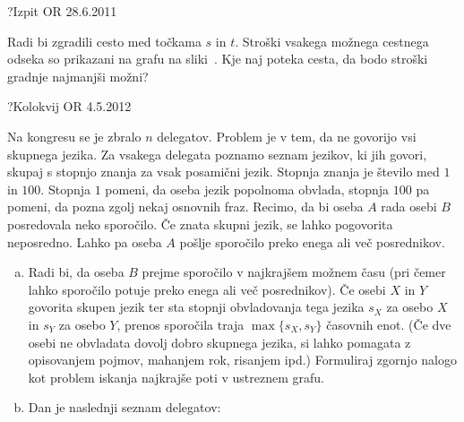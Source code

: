 \begin{naloga}{?}{Izpit OR 28.6.2011}
\begin{vprasanje}[cesta]
Radi bi zgradili cesto med točkama $s$ in $t$.
Stroški vsakega možnega cestnega odseka so prikazani na grafu na sliki~\fig{}.
Kje naj poteka cesta, da bodo stroški gradnje najmanjši možni?

\begin{slika}
\pgfslika
{}
\end{slika}
\end{vprasanje}
\begin{odgovor}
\end{odgovor}
\end{naloga}


\begin{naloga}{?}{Kolokvij OR 4.5.2012}
\begin{vprasanje}
Na kongresu se je zbralo $n$ delegatov.
Problem je v tem, da ne govorijo vsi skup\-ne\-ga jezika.
Za vsakega delegata poznamo seznam jezikov, ki jih govori,
skupaj s stopnjo znanja za vsak posamični jezik.
Stopnja znanja je število med $1$ in $100$.
Stopnja $1$ pomeni, da oseba jezik popolnoma obvlada,
stopnja $100$ pa pomeni, da pozna zgolj nekaj osnovnih fraz.
Recimo, da bi oseba $A$ rada osebi $B$ posredovala neko sporočilo.
Če znata skupni jezik, se lahko pogovorita neposredno.
Lahko pa oseba $A$ pošlje sporočilo preko enega ali več posrednikov.

\begin{enumerate}[(a)]
\item Radi bi, da oseba $B$ prejme sporočilo v najkrajšem možnem času
(pri čemer lahko sporočilo potuje preko enega ali več posrednikov).
Če osebi $X$ in $Y$ govorita skupen jezik
ter sta stopnji obvladovanja tega jezika
$s_X$ za osebo $X$ in $s_Y$ za osebo $Y$,
prenos sporočila traja $\max\{s_X, s_Y\}$ časovnih enot.
(Če dve osebi ne obvladata dovolj dobro skupnega jezika,
si lahko pomagata z opisovanjem pojmov, mahanjem rok, risanjem ipd.)
Formuliraj zgornjo nalogo
kot problem iskanja najkrajše poti v ustreznem grafu.

\item Dan je naslednji seznam delegatov:


\end{enumerate}
\end{vprasanje}
\end{naloga}
